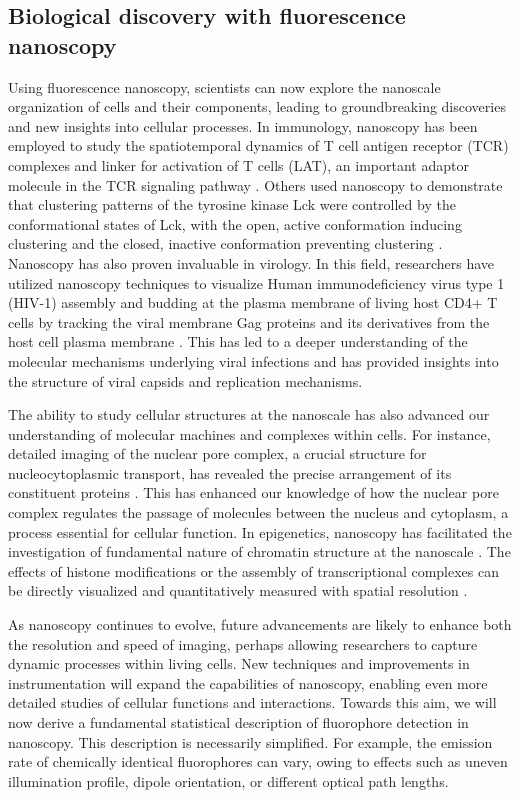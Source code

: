 \subsection{Biological discovery with fluorescence nanoscopy}

Using fluorescence nanoscopy, scientists can now explore the nanoscale organization of cells and their components, leading to groundbreaking discoveries and new insights into cellular processes. In immunology, nanoscopy has been employed to study the spatiotemporal dynamics of T cell antigen receptor (TCR) complexes and linker for activation of T cells (LAT), an important adaptor molecule in the TCR signaling pathway \parencite{Lillemeier2010}. Others used nanoscopy to demonstrate that clustering patterns of the tyrosine kinase Lck were controlled by the conformational states of Lck, with the open, active conformation inducing clustering and the closed, inactive conformation preventing clustering \parencite{Rossy2013}. Nanoscopy has also proven invaluable in virology. In this field, researchers have utilized nanoscopy techniques to visualize Human immunodeficiency virus type 1 (HIV-1) assembly and budding at the plasma membrane of living host CD4+ T cells by tracking the viral membrane Gag proteins and its derivatives from the host cell plasma membrane \parencite{Floderer2018}. This has led to a deeper understanding of the molecular mechanisms underlying viral infections and has provided insights into the structure of viral capsids and replication mechanisms.

The ability to study cellular structures at the nanoscale has also advanced our understanding of molecular machines and complexes within cells. For instance, detailed imaging of the nuclear pore complex, a crucial structure for nucleocytoplasmic transport, has revealed the precise arrangement of its constituent proteins \parencite{Wang2023}. This has enhanced our knowledge of how the nuclear pore complex regulates the passage of molecules between the nucleus and cytoplasm, a process essential for cellular function. In epigenetics, nanoscopy has facilitated the investigation of fundamental nature of chromatin structure at the nanoscale \parencite{Ricci2015}. The effects of histone modifications or the assembly of transcriptional complexes can be directly visualized and quantitatively measured with spatial resolution \parencite{Ricci2015,Nozaki2017,Boettiger2016}.

As nanoscopy continues to evolve, future advancements are likely to enhance both the resolution and speed of imaging, perhaps allowing researchers to capture dynamic processes within living cells. New techniques and improvements in instrumentation will expand the capabilities of nanoscopy, enabling even more detailed studies of cellular functions and interactions. Towards this aim, we will now derive a fundamental statistical description of fluorophore detection in nanoscopy. This description is necessarily simplified. For example, the emission rate of chemically identical fluorophores can vary, owing to effects such as uneven illumination profile, dipole orientation, or different optical path lengths.


